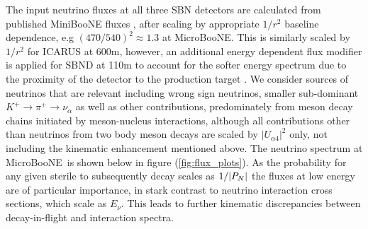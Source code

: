 \documentclass[11pt, a4paper]{article}
\def\muboone{MicroBooNE}
\def\ster{\ensuremath N}
\begin{document}
The input neutrino fluxes at all three SBN detectors are calculated from published
MiniBooNE fluxes \cite{AguilarArevalo:2008yp}, after scaling by appropriate
$1/r^2$ baseline dependence, e.g $(470/540)^2 \approx 1.3$ at \muboone. This
is similarly scaled by $1/r^2$ for ICARUS at 600m, however, an additional
energy dependent flux modifier is applied for SBND at 110m to account for the
softer energy spectrum due to the proximity of the detector to the production
target \cite{Antonello:2015lea}. We consider sources of neutrinos that are
relevant including wrong sign neutrinos, smaller sub-dominant $K^+\rightarrow
\pi^+\rightarrow \nu_\alpha$ as well as other contributions, predominately from
meson decay chains initiated by meson-nucleus interactions, although all
contributions other than neutrinos from two body meson decays are scaled by
$|U_{\alpha 4}|^2$ only, not including the kinematic enhancement mentioned
above. The neutrino spectrum at \muboone\ is shown below in figure
(\ref{fig:flux_plots}). As the probability for any given sterile to subsequently decay scales as
$1/|P_{\ster}|$ the fluxes at low energy are of particular importance, in stark contrast to neutrino interaction cross sections, which scale as $E_\nu$. This leads to further kinematic discrepancies between decay-in-flight and interaction spectra. 
\end{document}
